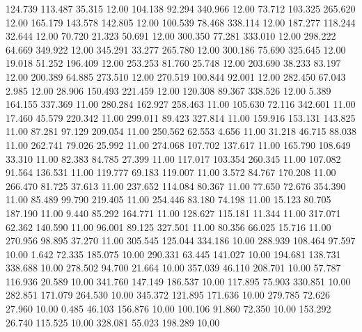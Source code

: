  124.739  113.487   35.315        12.00
 104.138   92.294  340.966        12.00
  73.712  103.325  265.620        12.00
 165.179  143.578  142.805        12.00
 100.539   78.468  338.114        12.00
 187.277  118.244   32.644        12.00
  70.720   21.323   50.691        12.00
 300.350   77.281  333.010        12.00
 298.222   64.669  349.922        12.00
 345.291   33.277  265.780        12.00
 300.186   75.690  325.645        12.00
  19.018   51.252  196.409        12.00
 253.253   81.760   25.748        12.00
 203.690   38.233   83.197        12.00
 200.389   64.885  273.510        12.00
 270.519  100.844   92.001        12.00
 282.450   67.043    2.985        12.00
  28.906  150.493  221.459        12.00
 120.308   89.367  338.526        12.00
   5.389  164.155  337.369        11.00
 280.284  162.927  258.463        11.00
 105.630   72.116  342.601        11.00
  17.460   45.579  220.342        11.00
 299.011   89.423  327.814        11.00
 159.916  153.131  143.825        11.00
  87.281   97.129  209.054        11.00
 250.562   62.553    4.656        11.00
  31.218   46.715   88.038        11.00
 262.741   79.026   25.992        11.00
 274.068  107.702  137.617        11.00
 165.790  108.649   33.310        11.00
  82.383   84.785   27.399        11.00
 117.017  103.354  260.345        11.00
 107.082   91.564  136.531        11.00
 119.777   69.183  119.007        11.00
   3.572   84.767  170.208        11.00
 266.470   81.725   37.613        11.00
 237.652  114.084   80.367        11.00
  77.650   72.676  354.390        11.00
  85.489   99.790  219.405        11.00
 254.446   83.180   74.198        11.00
  15.123   80.705  187.190        11.00
   9.440   85.292  164.771        11.00
 128.627  115.181   11.344        11.00
 317.071   62.362  140.590        11.00
  96.001   89.125  327.501        11.00
  80.356   66.025   15.716        11.00
 270.956   98.895   37.270        11.00
 305.545  125.044  334.186        10.00
 288.939  108.464   97.597        10.00
   1.642   72.335  185.075        10.00
 290.331   63.445  141.027        10.00
 194.681  138.731  338.688        10.00
 278.502   94.700   21.664        10.00
 357.039   46.110  208.701        10.00
  57.787  116.936   20.589        10.00
 341.760  147.149  186.537        10.00
 117.895   75.903  330.851        10.00
 282.851  171.079  264.530        10.00
 345.372  121.895  171.636        10.00
 279.785   72.626   27.960        10.00
   0.485   46.103  156.876        10.00
 100.106   91.860   72.350        10.00
 153.292   26.740  115.525        10.00
 328.081   55.023  198.289        10.00
